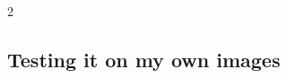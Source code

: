 \documentclass[letterpaper,10pt,french]{sphinxmanual}
\begin{document}
\noindent{}

\begin{sphinxVerbatim}[commandchars=\\\{\}]
\PYG{p}{[}\PYG{p}{]}
\end{sphinxVerbatim}

\begin{sphinxVerbatim}[commandchars=\\\{\}]
2
\end{sphinxVerbatim}


\subsection{Testing it on my own images}
\label{\detokenize{OCR_SAM:testing-it-on-my-own-images}}
\end{document}
